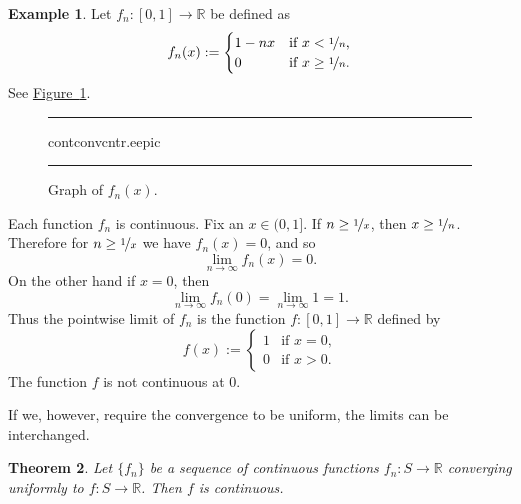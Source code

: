 \documentclass[12pt]{book}
\newenvironment{myfigureht}{%
\begin{figure}[h!t]
\noindent\rule{\textwidth}{0.4pt}\vspace{12pt}\par\centering}%
{\par\noindent\rule{\textwidth}{0.4pt}
\end{figure}}
\newcommand{\R}{{\mathbb{R}}}
\theoremstyle{plain}
\newtheorem{thm}{Theorem}[section]
\theoremstyle{remark}
\theoremstyle{definition}
\theoremstyle{exercise}
\theoremstyle{example}
\newtheorem{example}[thm]{Example}
\newcommand{\figureref}[1]{\hyperref[#1]{Figure~\ref*{#1}}}
\begin{document}
\begin{example}
Let $f_n \colon [0,1] \to \R$
be defined as
\begin{equation*}
f_n(x) :=
\begin{cases}
1-nx &  \text{if $x < \nicefrac{1}{n}$,}\\
0 &  \text{if $x \geq \nicefrac{1}{n}$.}
\end{cases}
\end{equation*}
See \figureref{contconvcntr:fig}.

\begin{myfigureht}
{contconvcntr.eepic}
\caption{Graph of $f_n(x)$.%
\label{contconvcntr:fig}}
\end{myfigureht}

Each function $f_n$ is continuous.
Fix an $x \in (0,1]$.  If $n \geq \nicefrac{1}{x}$,
then $x \geq \nicefrac{1}{n}$.  Therefore for $n \geq \nicefrac{1}{x}$
we have $f_n(x) = 0$, and so
\begin{equation*}
\lim_{n \to \infty} f_n(x) = 0.
\end{equation*}
On the other hand if $x=0$, then
\begin{equation*}
\lim_{n \to \infty} f_n(0) = 
\lim_{n \to \infty} 1 = 1.
\end{equation*}
Thus the pointwise limit of $f_n$ is the function
$f \colon [0,1] \to \R$ defined by
\begin{equation*}
f(x) :=
\begin{cases}
1 &  \text{if $x = 0$,}\\
0 &  \text{if $x > 0$.}
\end{cases}
\end{equation*}
The function $f$ is not continuous at 0.
\end{example}

If we, however, require the convergence to be uniform, the limits can
be interchanged.

\begin{thm}
Let $\{ f_n \}$ be 
a sequence of continuous functions $f_n \colon S \to \R$ converging
uniformly to  $f \colon S \to \R$.  Then $f$ is continuous.
\end{thm}
\end{document}
